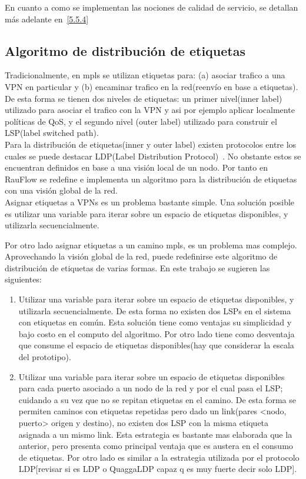 En cuanto a como se implementan las nociones de calidad de servicio, se detallan m\'as adelante en~\ref{5.5.4} 

\subsection{Algoritmo de distribución de etiquetas}
Tradicionalmente, en mpls se utilizan etiquetas para: (a) asociar trafico a una VPN en particular y (b) encaminar trafico en la red(reenvío en base a etiquetas). De esta forma se tienen dos niveles de etiquetas: un primer nivel(inner label) utilizado para asociar el trafico con la VPN y asi por ejemplo aplicar localmente políticas de QoS, y el segundo nivel (outer label) utilizado para construir el LSP(label switched path).\\

Para la distribución de etiquetas(inner y outer label) existen protocolos entre los cuales se puede destacar LDP(Label Distribution Protocol)~\citep{LDPRFC}. No obstante estos se encuentran definidos en base a una visión local de un nodo. Por tanto en RauFlow se redefine e implementa un algoritmo para la distribución de etiquetas con una visión global de la red.\\

Asignar etiquetas a VPNs es un problema bastante simple. Una  solución posible es utilizar una variable para iterar sobre un espacio de etiquetas disponibles, y utilizarla secuencialmente.  

Por otro lado asignar etiquetas a un camino mpls, es un problema mas complejo. Aprovechando la visión global de la red, puede redefinirse este algoritmo de distribución de etiquetas de varias formas. En este trabajo se sugieren las siguientes:

\begin{enumerate}
\item Utilizar una variable para iterar sobre un espacio de etiquetas disponibles, y utilizarla secuencialmente. De esta forma no existen dos LSPs en el sistema con etiquetas en com\'un. Esta solución tiene como ventajas su simplicidad y bajo costo en el computo del algoritmo. Por otro lado tiene como desventaja que consume el espacio de etiquetas disponibles(hay que considerar la escala del prototipo).

\item Utilizar una variable para iterar sobre un espacio de etiquetas disponibles para cada puerto asociado a un nodo de la red y por el cual pasa el LSP; cuidando a su vez que no se repitan etiquetas en el camino. De esta forma se permiten caminos con etiquetas repetidas pero dado un link(pares <nodo, puerto> origen y destino), no existen dos LSP con la misma etiqueta asignada a un mismo link. Esta estrategia es bastante mas elaborada que la anterior, pero presenta como principal ventaja que es austera en el consumo de etiquetas. Por otro lado es similar a la estrategia utilizada por el protocolo LDP[revisar si es LDP o QuaggaLDP capaz q es muy fuerte decir solo LDP].
\end{enumerate}

